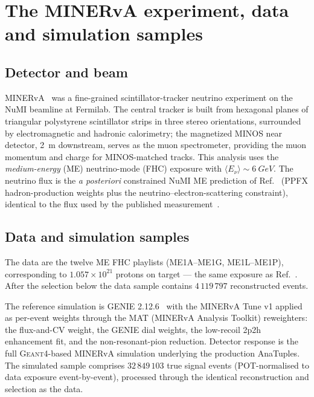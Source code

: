 \section{The MINERvA experiment, data and simulation samples}
\label{sec:experiment}

\subsection{Detector and beam}
MINERvA~\cite{MINERvA:2013zvz} was a fine-grained scintillator-tracker
neutrino experiment on the NuMI beamline at Fermilab. The central tracker is
built from hexagonal planes of triangular polystyrene scintillator strips in
three stereo orientations, surrounded by electromagnetic and hadronic
calorimetry; the magnetized MINOS near detector, \SI{2}{m} downstream, serves
as the muon spectrometer, providing the muon momentum and charge for
MINOS-matched tracks. This analysis uses the \emph{medium-energy} (ME)
neutrino-mode (FHC) exposure with $\langle E_\nu\rangle\sim\SI{6}{GeV}$. The
neutrino flux is the \emph{a posteriori} constrained NuMI ME prediction of
Ref.~\cite{MINERvA:2016iqn} (PPFX hadron-production weights plus the
neutrino--electron-scattering constraint), identical to the flux used by the
published measurement~\cite{MINERvA:2021owq}.

\subsection{Data and simulation samples}
The data are the twelve ME FHC playlists (ME1A--ME1G, ME1L--ME1P),
corresponding to $1.057\times10^{21}$ protons on target --- the same exposure
as Ref.~\cite{MINERvA:2021owq}. After the selection below the data sample
contains $4\,119\,797$ reconstructed events.

The reference simulation is GENIE 2.12.6~\cite{Andreopoulos:2009rq} with the
MINERvA Tune v1 applied as per-event weights through the MAT (MINERvA Analysis
Toolkit) reweighters: the flux-and-CV weight, the GENIE dial weights, the
low-recoil 2p2h enhancement fit, and the non-resonant-pion reduction. Detector
response is the full \textsc{Geant4}-based MINERvA simulation underlying the
production AnaTuples. The simulated sample comprises $32\,849\,103$ true
signal events (POT-normalised to data exposure event-by-event), processed
through the identical reconstruction and selection as the data.

